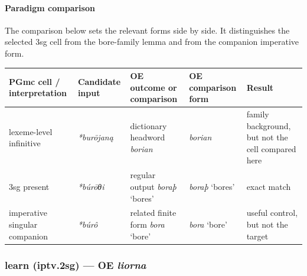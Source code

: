 \documentclass[
  british,
  a4paper,
]{article}
\newcounter{none} %
\begin{document}
\paragraph{Paradigm comparison}\label{paradigm-comparison-20}

The comparison below sets the relevant forms side by side. It
distinguishes the selected 3sg cell from the bore-family lemma and from
the companion imperative form.

{\def\LTcaptype{none} %
\begin{longtable}[]{@{}
  >{\raggedright\arraybackslash}p{}
  >{\raggedright\arraybackslash}p{}
  >{\raggedright\arraybackslash}p{}
  >{\raggedright\arraybackslash}p{}
  >{\raggedright\arraybackslash}p{}@{}}
\toprule\noalign{}
\begin{minipage}[b]{\linewidth}\raggedright
PGmc cell / interpretation
\end{minipage} & \begin{minipage}[b]{\linewidth}\raggedright
Candidate input
\end{minipage} & \begin{minipage}[b]{\linewidth}\raggedright
OE outcome or comparison
\end{minipage} & \begin{minipage}[b]{\linewidth}\raggedright
OE comparison form
\end{minipage} & \begin{minipage}[b]{\linewidth}\raggedright
Result
\end{minipage} \\
\midrule\noalign{}
\endhead
\bottomrule\noalign{}
\endlastfoot
lexeme-level infinitive & {\emph{*burōjaną}} & dictionary headword
{\emph{borian}} & {\emph{borian}} & family background, but not the cell
compared here \\
3sg present & {\emph{*búrōθi}} & regular output {\emph{boraþ}} `bores' &
{\emph{boraþ}} `bores' & exact match \\
imperative singular companion & {\emph{*búrô}} & related finite form
{\emph{bora}} `bore' & {\emph{bora}} `bore' & useful control, but not
the target \\
\end{longtable}
}

\subsubsection{\texorpdfstring{learn (iptv.2sg) --- OE
\emph{liorna}}{learn (iptv.2sg) --- OE liorna}}\label{learn-iptv.2sg-oe-liorna}
\end{document}
